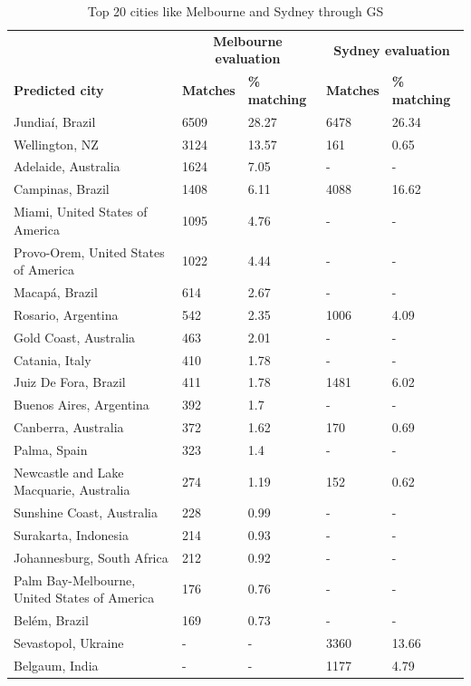 \documentclass[final,3p,times,authoryear]{elsarticle}
\begin{document}
\begin{table}[!htbp]
\caption{Top 20 cities like Melbourne and Sydney through GS \label{tab:melbournesydneyGS}}     
\begin{tabular}{| l | l |l| l | l|}
\hline
 \hline    &  \multicolumn{2}{c|}{\textbf{Melbourne evaluation}} & \multicolumn{2}{c|}{\textbf{Sydney evaluation}}  \\  
\textbf{Predicted city} & \textbf{Matches} & \textbf{\% matching}  & \textbf{Matches} & \textbf{\% matching}\\ \hline
Jundia\'{i}, Brazil & 6509 & 28.27 & 6478 & 26.34 \\ \hline
Wellington, NZ & 3124 & 13.57 & 161 & 0.65 \\ \hline
Adelaide, Australia & 1624 & 7.05 &-&- \\ \hline
Campinas, Brazil & 1408 & 6.11 & 4088 & 16.62 \\ \hline
Miami, United States of America & 1095 & 4.76 &-&- \\ \hline
Provo-Orem, United States of America & 1022 & 4.44 &-&- \\ \hline
Macap\'{a}, Brazil & 614 & 2.67 &-&- \\ \hline
Rosario, Argentina & 542 & 2.35 & 1006 & 4.09 \\ \hline
Gold Coast, Australia & 463 & 2.01 &-&- \\ \hline
Catania, Italy & 410 & 1.78 &-&- \\ \hline
Juiz De Fora, Brazil & 411 & 1.78 & 1481 & 6.02 \\ \hline
Buenos Aires, Argentina & 392 & 1.7 &-&- \\ \hline
Canberra, Australia & 372 & 1.62 & 170 & 0.69 \\ \hline
Palma, Spain & 323 & 1.4 &-&- \\ \hline
Newcastle and Lake Macquarie, Australia & 274 & 1.19 & 152 & 0.62 \\ \hline
Sunshine Coast, Australia & 228 & 0.99 &-&- \\ \hline
Surakarta, Indonesia & 214 & 0.93 &-&- \\ \hline
Johannesburg, South Africa & 212 & 0.92 &-&- \\ \hline
Palm Bay-Melbourne, United States of America & 176 & 0.76 &-&- \\ \hline
Bel\'{e}m, Brazil & 169 & 0.73 &-&- \\ \hline
Sevastopol, Ukraine &-&- & 3360 & 13.66\\ \hline
Belgaum, India &-&- & 1177 & 4.79\\ \hline

\end{tabular}
\end{table}
\end{document}
